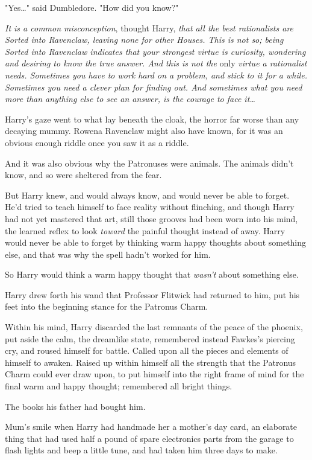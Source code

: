 "Yes{\ldots}" said Dumbledore. "How did you know?"

\emph{It is a common misconception}, thought Harry, \emph{that all the best 
rationalists are Sorted into Ravenclaw, leaving none for other Houses. This is 
not so; being Sorted into Ravenclaw indicates that your strongest virtue is 
curiosity, wondering and desiring to know the true answer. And this is not the} 
only\emph{ virtue a rationalist needs. Sometimes you have to work hard on a 
problem, and stick to it for a while. Sometimes you need a clever plan for 
finding out. And sometimes what you need more than anything else to see an 
answer, is the courage to face it{\ldots}}

Harry's gaze went to what lay beneath the cloak, the horror far worse than any 
decaying mummy. Rowena Ravenclaw might also have known, for it was an obvious 
enough riddle once you saw it as a riddle.

And it was also obvious why the Patronuses were animals. The animals didn't 
know, and so were sheltered from the fear.

But Harry knew, and would always know, and would never be able to forget. He'd 
tried to teach himself to face reality without flinching, and though Harry had 
not yet mastered that art, still those grooves had been worn into his mind, the 
learned reflex to look \emph{toward} the painful thought instead of away. Harry 
would never be able to forget by thinking warm happy thoughts about something 
else, and that was why the spell hadn't worked for him.

So Harry would think a warm happy thought that \emph{wasn't} about something 
else.

Harry drew forth his wand that Professor Flitwick had returned to him, put his 
feet into the beginning stance for the Patronus Charm.

Within his mind, Harry discarded the last remnants of the peace of the phoenix, 
put aside the calm, the dreamlike state, remembered instead Fawkes's piercing 
cry, and roused himself for battle. Called upon all the pieces and elements of 
himself to awaken. Raised up within himself all the strength that the Patronus 
Charm could ever draw upon, to put himself into the right frame of mind for the 
final warm and happy thought; remembered all bright things.

The books his father had bought him.

Mum's smile when Harry had handmade her a mother's day card, an elaborate thing 
that had used half a pound of spare electronics parts from the garage to flash 
lights and beep a little tune, and had taken him three days to make.

